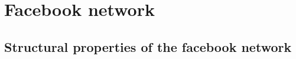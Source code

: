 \documentclass[11pt]{article}
\begin{document}


\section{Facebook network}

\subsection{Structural properties of the facebook network}
\end{document}
